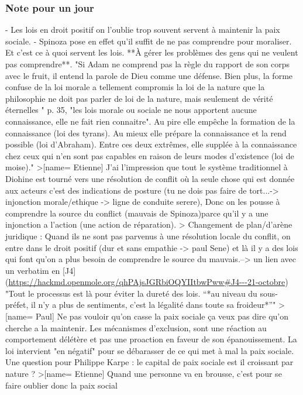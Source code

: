 \subsubsection{Note pour un jour}
 - Les lois en droit positif on l'oublie trop souvent servent à maintenir la paix sociale.
 - Spinoza pose en effet qu'il suffit de ne pas comprendre pour moraliser. Et c'est ce à quoi servent les lois. **À gérer les problèmes des gens qui ne veulent pas comprendre**. "Si Adam ne comprend pas la règle du rapport de son corps avec le fruit, il entend la parole de Dieu comme une défense. Bien plus, la forme confuse de la loi morale a tellement compromis la loi de la nature que la philosophie ne doit pas parler de loi de la nature, mais seulement de vérité éternelles "  p. 35, "les lois morale ou sociale ne nous apportent aucune connaissance, elle ne fait rien connaitre". Au pire elle empêche la formation de la connaissance (loi des tyrans). Au mieux elle prépare la connaissance et la rend possible (loi d'Abraham). Entre ces deux extrêmes, elle supplée à la connaissance chez ceux qui n'en sont pas capables en raison de leurs modes d'existence (loi de moise)."
>[name= Etienne] J'ai l'impression que tout le système traditionnel à Diohine est tourné vers une résolution de conflit où la seule chose qui est donnée aux acteurs c'est des indications de posture (tu ne dois pas faire de tort...-> injonction morale/ethique -> ligne de conduite serere), Donc on les pousse à comprendre la source du conflict (mauvais de Spinoza)parce qu'il y a une injonction a l'action (une action de réparation). 
>
 Changement de plan/d'arène juridique : Quand ils ne sont pas parvenus à une résolution locale du conflit, on entre dans le droit positif (dur et sans empathie -> paul Sene) et là il y a des lois qui font qu'on a plus besoin de comprendre le source du mauvais.--> un lien avec un verbatim en [J4](\url{https://hackmd.openmole.org/qhPAjsJGRbiOQYIItbwPww#J4---21-octobre}) "Tout le processus est là pour éviter la dureté des lois. “*au niveau du sous-préfet, il n’y a plus de sentiments, c’est la légalité dans toute sa froideur*”"
>[name= Paul] Ne pas vouloir qu'on casse la paix sociale ça veux pas dire qu'on cherche a la maintenir. Les mécanismes d'exclusion, sont une réaction au comportement délétère et pas une proaction en faveur de son épanouissement. La loi intervient "en négatif" pour se débarasser de ce qui met à mal la paix sociale. Une question pour Philippe Karpe : le capital de paix sociale est il croissant par nature ? 
>[name= Etienne] Quand une personne va en brousse, c'est pour se faire oublier donc la paix social


